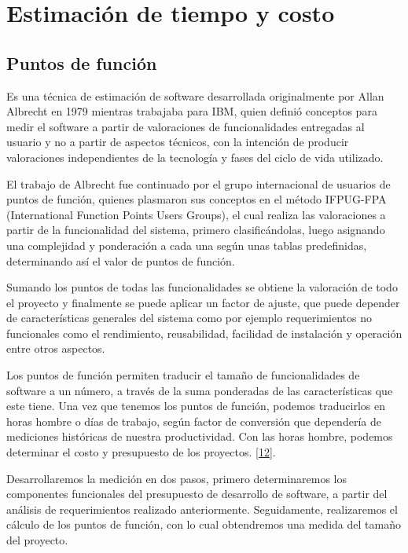 

\chapter{Estimación de tiempo y costo} \label{cap:cinco}

\section{Puntos de función}

Es una técnica de estimación de software desarrollada originalmente por Allan Albrecht en 1979 mientras trabajaba para IBM, quien definió conceptos para medir el software a partir de valoraciones de funcionalidades entregadas al usuario y no a partir de aspectos técnicos, con la intención de producir valoraciones independientes de la tecnología y fases del ciclo de vida utilizado.

El trabajo de Albrecht fue continuado por el grupo internacional de usuarios de puntos de función, quienes plasmaron sus conceptos en el método IFPUG-FPA (International Function Points Users Groups), el cual realiza las valoraciones a partir de la funcionalidad del sistema, primero clasificándolas, luego asignando una complejidad y ponderación a cada una según unas tablas predefinidas, determinando así el valor de puntos de función.

Sumando los puntos de todas las funcionalidades se obtiene la valoración de todo el proyecto y finalmente se puede aplicar un factor de ajuste, que puede depender de características generales del sistema como por ejemplo requerimientos no funcionales como el rendimiento, reusabilidad, facilidad de instalación y operación entre otros aspectos.

Los puntos de función permiten traducir el tamaño de funcionalidades de software a un número, a través de la suma ponderadas de las características que este tiene. Una vez que tenemos los puntos de función, podemos traducirlos en horas hombre o días de trabajo, según factor de conversión que dependería de mediciones históricas de nuestra productividad. Con las horas hombre, podemos determinar el costo y presupuesto de los proyectos. \hyperlink{b12}{[12]}.

\newpage

Desarrollaremos la medición en dos pasos, primero determinaremos los componentes funcionales del presupuesto de desarrollo de software, a partir del análisis de requerimientos realizado anteriormente. Seguidamente, realizaremos el cálculo de los puntos de función, con lo cual obtendremos una medida del tamaño del proyecto.\\

